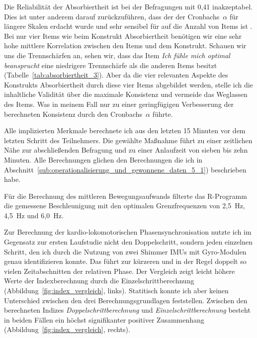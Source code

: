 Die Reliabilität der Absorbiertheit ist bei der Befragungen mit 0,41 inakzeptabel. Dies ist unter anderem darauf zurückzuführen, dass der der Cronbachs~$\alpha$ für längere Skalen erdacht wurde und sehr sensibel für auf die Anzahl von Items ist \citep{Cortina1993}. Bei nur vier Items wie beim Konstrukt Absorbiertheit benötigen wir eine sehr hohe mittlere Korrelation zwischen den Items und dem Konstrukt. Schauen wir uns die Trennschärfen an, sehen wir, dass das Item \emph{Ich fühle mich optimal beansprucht} eine niedrigere Trennschärfe als die anderen Items besitzt (Tabelle~\ref{tab:absorbiertheit_3}). Aber da die vier relevanten Aspekte des Konstrukts Absorbiertheit durch diese vier Items abgebildet werden, stelle ich die inhaltliche Validität über die maximale Konsistenz und vermeide das Weglassen des Items. Was in meinem Fall nur zu einer geringfügigen Verbesserung der berechneten Konsistenz durch den Cronbachs~$\alpha$ führte. 

Alle implizierten Merkmale berechnete ich aus den letzten 15 Minuten vor dem letzten Schritt des Teilnehmers. Die gewählte Maßnahme führt zu einer zeitlichen Nähe zur abschließenden Befragung und zu einer Anlaufzeit von sieben bis zehn Minuten. Alle Berechnungen glichen den Berechnungen die ich in Abschnitt~\ref{sub:operationalisierung_und_gewonnene_daten_5_1}) beschrieben habe.

Für die Berechnung des mittleren Bewegungsaufwands filterte das R-Programm die gemessene Beschleunigung mit den optimalen Grenzfrequenzen von 2,5~Hz, 4,5~Hz und 6,0~Hz. 

Zur Berechnung der kardio-lokomotorischen Phasensynchronisation nutzte ich im Gegensatz zur ersten Laufstudie nicht den Doppelschritt, sondern jeden einzelnen Schritt, den ich durch die Nutzung von zwei Shimmer \acp{IMU} mit Gyro-Modulen genau identifizieren konnte. Das führt zur kürzeren und in der Regel doppelt so vielen Zeitabschnitten der relativen Phase. Der Vergleich zeigt leicht höhere Werte der Indexberechnung durch die Einzelschrittberechnung (Abbildung~\ref{fig:index_vergleich}, links). Statitisch konnte ich aber keinen Unterschied zwischen den drei Berechnungsgrundlagen feststellen. Zwischen den berechneten Indizes \emph{Doppelschrittberechnung} und \emph{Einzelschrittberechnung} besteht in beiden Fällen ein höchst signifikanter positiver Zusammenhang (Abbildung~\ref{fig:index_vergleich}, rechts). 

